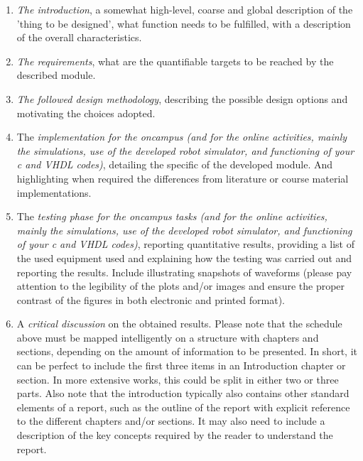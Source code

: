 \begin{enumerate}
\item  \textit{The introduction}, a somewhat high-level, coarse and global description of the 'thing to be designed', what function needs to be fulfilled, with a description of the overall characteristics.

\item  \textit{The requirements}, what are the quantifiable targets to be reached by the described module.

\item  \textit{The followed design methodology}, describing the possible design options and motivating the choices adopted.

\item  The \textit{implementation for the oncampus (and for the online activities, mainly the simulations, use of the developed robot simulator, and functioning of your c and VHDL codes)}, detailing the specific of the developed module. And highlighting when required the differences from literature or course material implementations.

\item  The \textit{testing phase for the oncampus tasks (and for the online activities, mainly the simulations, use of the developed robot simulator, and functioning of your c and VHDL codes)}, reporting quantitative results, providing a list of the used equipment used and explaining how the testing was carried out and reporting the results. Include illustrating snapshots of waveforms (please pay attention to the legibility of the plots and/or images and ensure the proper contrast of the figures in both electronic and printed format).

\item  A \textit{critical discussion }on the obtained results. Please note that the schedule above must be mapped intelligently on a structure with chapters and sections, depending on the amount of information to be presented. In short, it can be perfect to include the first three items in an Introduction chapter or section. In more extensive works, this could be split in either two or three parts. Also note that the introduction typically also contains other standard elements of a report, such as the outline of the report with explicit reference to the different chapters and/or sections. It may also need to include a description of the key concepts required by the reader to understand the report.

\end{enumerate}



